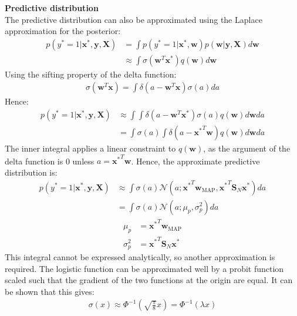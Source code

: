 \documentclass[a4paper]{article}
\begin{document}
    \vspace{\baselineskip}
    \noindent\textbf{Predictive distribution} \\
    The predictive distribution can also be approximated using the Laplace approximation for the posterior:
    \begin{align}
        p(y^* = 1 | \bm{x}^*, \bm{y}, \bm{X}) &= \int p(y^* = 1 | \bm{x}^*, \bm{w}) p(\bm{w} | \bm{y}, \bm{X}) d\bm{w} \nonumber \\
        & \approx \int \sigma(\bm{w}^T\bm{x}^*) q(\bm{w}) d\bm{w} \nonumber
    \end{align}
    Using the sifting property of the delta function:
    \begin{align}
        \sigma(\bm{w}^T \bm{x}) = \int \delta(a - \bm{w}^T \bm{x}) \sigma(a) da \nonumber
    \end{align}
    Hence:
     \begin{align}
        p(y^* = 1 | \bm{x}^*, \bm{y}, \bm{X}) &\approx \int \int \delta(a - \bm{w}^T \bm{x}^*) \sigma(a) q(\bm{w}) d\bm{w} da \nonumber \\
         &= \int \sigma(a) \int \delta(a - {\bm{x}^*}^T \bm{w}) q(\bm{w}) d\bm{w} da \nonumber
    \end{align}
    The inner integral applies a linear constraint to $q(\bm{w})$, as the argument of the delta function is 0 unless $a = {\bm{x}^*}^T \bm{w}$.
    Hence, the approximate predictive distribution is:
    \begin{align}
        \label{eq:intermediate-approx-predictive}
         p(y^* = 1 | \bm{x}^*, \bm{y}, \bm{X}) &\approx \int \sigma(a) \mathcal{N}(a; {\bm{x}^*}^T \bm{w}_\text{MAP}, {\bm{x}^*}^T \bm{S}_N \bm{x^*}) da \nonumber \\
        &= \int \sigma(a) \mathcal{N}(a; \mu_p, \sigma_p^2) da
     \end{align}
    \begin{align*}
        \mu_p &= {\bm{x}^*}^T \bm{w}_\text{MAP}\\
        \sigma_p^2 &= {\bm{x}^*}^T \bm{S}_N \bm{x^*}
    \end{align*}
    This integral cannot be expressed analytically, so another approximation is required.
    The logistic function can be approximated well by a probit function scaled such that the gradient of the two functions at the origin are equal.
    It can be shown that this gives:
    \begin{align}
        \label{eq:probit-approximation}
        \sigma(x) \approx \Phi^{-1}\left(\sqrt{\frac{\pi}{8}} x\right) = \Phi^{-1}(\lambda x)
    \end{align}
\end{document}
